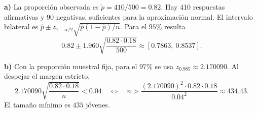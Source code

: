 \textbf{a)} La proporción observada es $\hat p=410/500=0.82$.
Hay 410 respuestas afirmativas y 90 negativas, suficientes para la
aproximación normal. El intervalo bilateral es
$\hat p\pm z_{1-\alpha/2}\sqrt{\hat p(1-\hat p)/n}$.
Para el $95\%$ resulta
\[
0.82\pm1.960\sqrt{\frac{0.82\cdot0.18}{500}}
\approx\boxed{[0.7863,\ 0.8537]}.
\]

\textbf{b)} Con la proporción muestral fija, para el $97\%$ se usa
$z_{0.985}\approx2.170090$. Al despejar el margen estricto,
\[
2.170090\sqrt{\frac{0.82\cdot0.18}{n}}<0.04
\quad\Longleftrightarrow\quad
n>\frac{(2.170090)^2\cdot0.82\cdot0.18}{0.04^2}\approx434.43.
\]
El tamaño mínimo es $\boxed{435}$ jóvenes.
